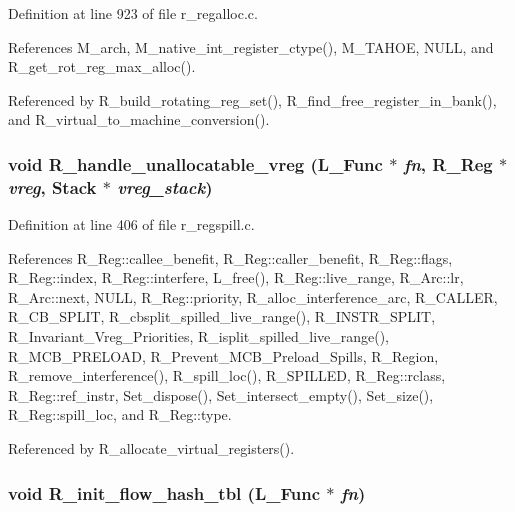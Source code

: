 Definition at line 923 of file r\_\-regalloc.c.

References M\_\-arch, M\_\-native\_\-int\_\-register\_\-ctype(), M\_\-TAHOE, NULL, and R\_\-get\_\-rot\_\-reg\_\-max\_\-alloc().

Referenced by R\_\-build\_\-rotating\_\-reg\_\-set(), R\_\-find\_\-free\_\-register\_\-in\_\-bank(), and R\_\-virtual\_\-to\_\-machine\_\-conversion().
\subsubsection{\setlength{\rightskip}{0pt plus 5cm}void R\_\-handle\_\-unallocatable\_\-vreg (L\_\-Func $\ast$ {\em fn}, \bf{R\_\-Reg} $\ast$ {\em vreg}, \bf{Stack} $\ast$ {\em vreg\_\-stack})}\label{r__regproto_8h_5f3a7dd764326338bc738c443c4987f9}




Definition at line 406 of file r\_\-regspill.c.

References R\_\-Reg::callee\_\-benefit, R\_\-Reg::caller\_\-benefit, R\_\-Reg::flags, R\_\-Reg::index, R\_\-Reg::interfere, L\_\-free(), R\_\-Reg::live\_\-range, R\_\-Arc::lr, R\_\-Arc::next, NULL, R\_\-Reg::priority, R\_\-alloc\_\-interference\_\-arc, R\_\-CALLER, R\_\-CB\_\-SPLIT, R\_\-cbsplit\_\-spilled\_\-live\_\-range(), R\_\-INSTR\_\-SPLIT, R\_\-Invariant\_\-Vreg\_\-Priorities, R\_\-isplit\_\-spilled\_\-live\_\-range(), R\_\-MCB\_\-PRELOAD, R\_\-Prevent\_\-MCB\_\-Preload\_\-Spills, R\_\-Region, R\_\-remove\_\-interference(), R\_\-spill\_\-loc(), R\_\-SPILLED, R\_\-Reg::rclass, R\_\-Reg::ref\_\-instr, Set\_\-dispose(), Set\_\-intersect\_\-empty(), Set\_\-size(), R\_\-Reg::spill\_\-loc, and R\_\-Reg::type.

Referenced by R\_\-allocate\_\-virtual\_\-registers().
\subsubsection{\setlength{\rightskip}{0pt plus 5cm}void R\_\-init\_\-flow\_\-hash\_\-tbl (L\_\-Func $\ast$ {\em fn})}\label{r__regproto_8h_015241c492147f1b6ce5934ea1e1256f}




